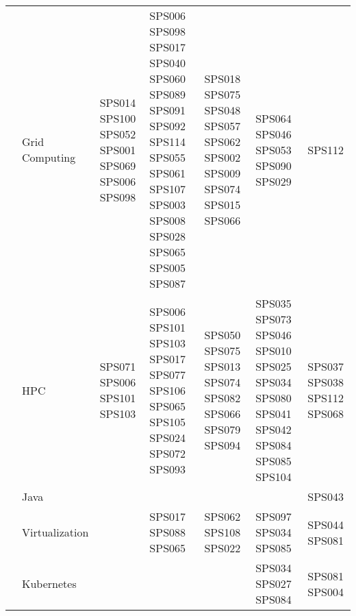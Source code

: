 \begin{table*}[htbp]
\begin{tabularx}{\textwidth}{p{0.8cm}p{2.5cm}>{\raggedright\arraybackslash}X>{\raggedright\arraybackslash}X>{\raggedright\arraybackslash}X>{\raggedright\arraybackslash}X>{\raggedright\arraybackslash}X}
		\addlinespace[0.3em]
		                                      & Grid Computing          & SPS014 SPS100 SPS052 SPS001 SPS069 SPS006 SPS098        & SPS006 SPS098 SPS017 SPS040 SPS060 SPS089 SPS091 SPS092 SPS114 SPS055 SPS061 SPS107 SPS003 SPS008 SPS028 SPS065 SPS005 SPS087 & SPS018 SPS075 SPS048 SPS057 SPS062 SPS002 SPS009 SPS074 SPS015 SPS066                      & SPS064 SPS046 SPS053 SPS090 SPS029                                                  & SPS112                             \\
		\addlinespace[0.3em]
		                                      & HPC                     & SPS071 SPS006 SPS101 SPS103                             & SPS006 SPS101 SPS103 SPS017 SPS077 SPS106 SPS065 SPS105 SPS024 SPS072 SPS093                                                  & SPS050 SPS075 SPS013 SPS074 SPS082 SPS066 SPS079 SPS094                                    & SPS035 SPS073 SPS046 SPS010 SPS025 SPS034 SPS080 SPS041 SPS042 SPS084 SPS085 SPS104 & SPS037 SPS038 SPS112 SPS068        \\
		\addlinespace[0.3em]
		                                      & Java                    &                                                         &                                                                                                                               &                                                                                            &                                                                                     & SPS043                             \\
		\addlinespace[0.3em]
		                                      & Virtualization          &                                                         & SPS017 SPS088 SPS065                                                                                                          & SPS062 SPS108 SPS022                                                                       & SPS097 SPS034 SPS085                                                                & SPS044 SPS081                      \\
		\addlinespace[0.3em]
		                                      & Kubernetes              &                                                         &                                                                                                                               &                                                                                            & SPS034 SPS027 SPS084                                                                & SPS081 SPS004                      \\

\end{tabularx}
\end{table*}
